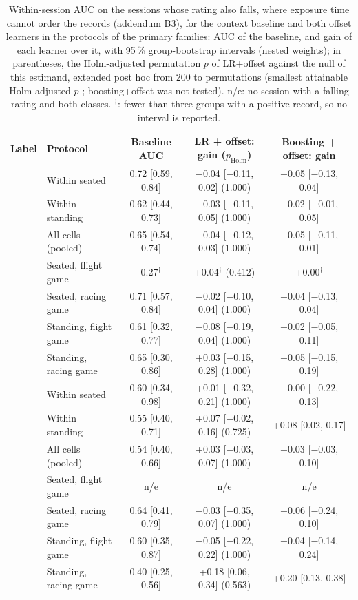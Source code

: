 \begin{table}[ht]
\centering
\scriptsize
\caption{Within-session AUC on the sessions whose rating also falls, where exposure time cannot order the records (addendum B3), for the context baseline and both offset learners in the protocols of the primary families: AUC of the baseline, and gain of each learner over it, with 95\,\% group-bootstrap intervals (nested weights); in parentheses, the Holm-adjusted permutation $p$ of LR+offset against the null of this estimand, extended post hoc from 200 to  permutations (smallest attainable Holm-adjusted $p$ ; boosting+offset was not tested). n/e: no session with a falling rating and both classes. $^\dagger$: fewer than three groups with a positive record, so no interval is reported.}
\label{tab:supp_falling}
\setlength{\tabcolsep}{3pt}
\begin{tabular}{@{}llccc@{}}
\toprule
Label & Protocol & Baseline AUC & LR + offset: gain ($p_\mathrm{Holm}$) & Boosting + offset: gain \\
\midrule
\sevtwo{} & Within seated & 0.72 [0.59, 0.84] & $-$0.04 [$-$0.11, 0.02] (1.000) & $-$0.05 [$-$0.13, 0.04] \\
 & Within standing & 0.62 [0.44, 0.73] & $-$0.03 [$-$0.11, 0.05] (1.000) & +0.02 [$-$0.01, 0.05] \\
 & All cells (pooled) & 0.65 [0.54, 0.74] & $-$0.04 [$-$0.12, 0.03] (1.000) & $-$0.05 [$-$0.11, 0.01] \\
 & Seated, flight game & 0.27$^\dagger$ & +0.04$^\dagger$ (0.412) & +0.00$^\dagger$ \\
 & Seated, racing game & 0.71 [0.57, 0.84] & $-$0.02 [$-$0.10, 0.04] (1.000) & $-$0.04 [$-$0.13, 0.04] \\
 & Standing, flight game & 0.61 [0.32, 0.77] & $-$0.08 [$-$0.19, 0.04] (1.000) & +0.02 [$-$0.05, 0.11] \\
 & Standing, racing game & 0.65 [0.30, 0.86] & +0.03 [$-$0.15, 0.28] (1.000) & $-$0.05 [$-$0.15, 0.19] \\
\midrule
\sevone{} & Within seated & 0.60 [0.34, 0.98] & +0.01 [$-$0.32, 0.21] (1.000) & $-$0.00 [$-$0.22, 0.13] \\
 & Within standing & 0.55 [0.40, 0.71] & +0.07 [$-$0.02, 0.16] (0.725) & +0.08 [0.02, 0.17] \\
 & All cells (pooled) & 0.54 [0.40, 0.66] & +0.03 [$-$0.03, 0.07] (1.000) & +0.03 [$-$0.03, 0.10] \\
 & Seated, flight game & n/e & n/e & n/e \\
 & Seated, racing game & 0.64 [0.41, 0.79] & $-$0.03 [$-$0.35, 0.07] (1.000) & $-$0.06 [$-$0.24, 0.10] \\
 & Standing, flight game & 0.60 [0.35, 0.87] & $-$0.05 [$-$0.22, 0.22] (1.000) & +0.04 [$-$0.14, 0.24] \\
 & Standing, racing game & 0.40 [0.25, 0.56] & +0.18 [0.06, 0.34] (0.563) & +0.20 [0.13, 0.38] \\
\bottomrule
\end{tabular}
\end{table}
